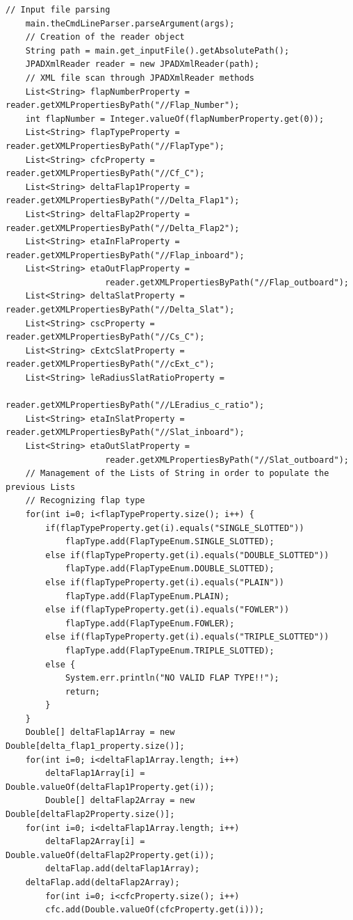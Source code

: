 \begin{lstlisting}[caption={Excerpt of B747-100B test - Input data reading}, captionpos=b, tabsize=2]
	// Input file parsing
	main.theCmdLineParser.parseArgument(args);
	// Creation of the reader object
	String path = main.get_inputFile().getAbsolutePath();
	JPADXmlReader reader = new JPADXmlReader(path);
	// XML file scan through JPADXmlReader methods
	List<String> flapNumberProperty = reader.getXMLPropertiesByPath("//Flap_Number");
	int flapNumber = Integer.valueOf(flapNumberProperty.get(0));
	List<String> flapTypeProperty = reader.getXMLPropertiesByPath("//FlapType");
	List<String> cfcProperty = reader.getXMLPropertiesByPath("//Cf_C");
	List<String> deltaFlap1Property = reader.getXMLPropertiesByPath("//Delta_Flap1");
	List<String> deltaFlap2Property = reader.getXMLPropertiesByPath("//Delta_Flap2");
	List<String> etaInFlaProperty = reader.getXMLPropertiesByPath("//Flap_inboard");
	List<String> etaOutFlapProperty = 
					reader.getXMLPropertiesByPath("//Flap_outboard");
	List<String> deltaSlatProperty = reader.getXMLPropertiesByPath("//Delta_Slat");
	List<String> cscProperty = reader.getXMLPropertiesByPath("//Cs_C");
	List<String> cExtcSlatProperty = reader.getXMLPropertiesByPath("//cExt_c");
	List<String> leRadiusSlatRatioProperty = 
					reader.getXMLPropertiesByPath("//LEradius_c_ratio");
	List<String> etaInSlatProperty = reader.getXMLPropertiesByPath("//Slat_inboard");
	List<String> etaOutSlatProperty = 
					reader.getXMLPropertiesByPath("//Slat_outboard");
	// Management of the Lists of String in order to populate the previous Lists  
	// Recognizing flap type
	for(int i=0; i<flapTypeProperty.size(); i++) {
		if(flapTypeProperty.get(i).equals("SINGLE_SLOTTED"))
			flapType.add(FlapTypeEnum.SINGLE_SLOTTED);
		else if(flapTypeProperty.get(i).equals("DOUBLE_SLOTTED"))
			flapType.add(FlapTypeEnum.DOUBLE_SLOTTED);
		else if(flapTypeProperty.get(i).equals("PLAIN"))
			flapType.add(FlapTypeEnum.PLAIN);
		else if(flapTypeProperty.get(i).equals("FOWLER"))
			flapType.add(FlapTypeEnum.FOWLER);
		else if(flapTypeProperty.get(i).equals("TRIPLE_SLOTTED"))
			flapType.add(FlapTypeEnum.TRIPLE_SLOTTED);
		else {
			System.err.println("NO VALID FLAP TYPE!!");
			return;
		}
	}
	Double[] deltaFlap1Array = new Double[delta_flap1_property.size()];
	for(int i=0; i<deltaFlap1Array.length; i++)
		deltaFlap1Array[i] = Double.valueOf(deltaFlap1Property.get(i));
		Double[] deltaFlap2Array = new Double[deltaFlap2Property.size()];
	for(int i=0; i<deltaFlap1Array.length; i++)
		deltaFlap2Array[i] = Double.valueOf(deltaFlap2Property.get(i));
		deltaFlap.add(deltaFlap1Array);
	deltaFlap.add(deltaFlap2Array);
		for(int i=0; i<cfcProperty.size(); i++)
		cfc.add(Double.valueOf(cfcProperty.get(i)));

\end{lstlisting}
